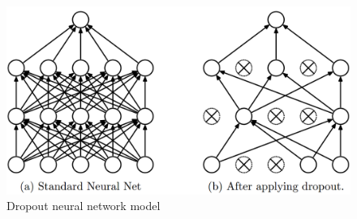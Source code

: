 \begin{figure}
    \centerline{\includegraphics[width=1\columnwidth]{03-neural-networks-in-tumor-detection/figures/dropout.png}}
    \caption{ Dropout neural network model }
    \label{figure:dropout}
\end{figure}